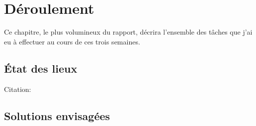 \hypertarget{Déroulement}{%
\chapter{Déroulement}\label{Déroulement}}

Ce chapitre, le plus volumineux du rapport, décrira l'ensemble des tâches que j'ai eu à effectuer au cours de ces trois semaines.


\section{État des lieux}
Citation:
\cite{Lympero}

\section{Solutions envisagées}
